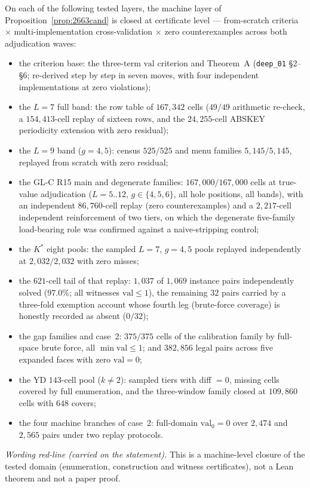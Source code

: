 \begin{theorem}\label{thm:machM}
On each of the following tested layers, the machine layer of
Proposition~\ref{prop:2663cand} is closed at certificate level ---
from-scratch criteria $\times$ multi-implementation cross-validation $\times$ zero
counterexamples across both adjudication waves:
\begin{itemize}[leftmargin=2em,itemsep=0.1em]
\item the criterion base: the three-term $\mathrm{val}$ criterion and
Theorem~A (\texttt{deep\_01} \S2--\S6; re-derived step by step in seven
moves, with four independent implementations at zero violations);
\item the $L=7$ full band: the row table of $167{,}342$ cells ($49/49$
arithmetic re-check, a $154{,}413$-cell replay of sixteen rows, and the
$24{,}255$-cell ABSKEY periodicity extension with zero residual);
\item the $L=9$ band ($g=4,5$): census $525/525$ and menu families
$5{,}145/5{,}145$, replayed from scratch with zero residual;
\item the GL-C R15 main and degenerate families: $167{,}000/167{,}000$
cells at true-value adjudication ($L=5..12$, $g\in\{4,5,6\}$, all hole
positions, all bands), with an independent $86{,}760$-cell replay (zero
counterexamples) and a $2{,}217$-cell independent reinforcement of two
tiers, on which the degenerate five-family load-bearing role was confirmed
against a naive-stripping control;
\item the $K^*$ eight pools: the sampled $L=7$, $g=4,5$ pools replayed
independently at $2{,}032/2{,}032$ with zero misses;
\item the $621$-cell tail of that replay: $1{,}037$ of $1{,}069$ instance
pairs independently solved ($97.0\%$; all witnesses $\mathrm{val}\le1$),
the remaining $32$ pairs carried by a three-fold exemption account whose
fourth leg (brute-force coverage) is honestly recorded as absent ($0/32$);
\item the gap families and case~2: $375/375$ cells of the calibration
family by full-space brute force, all $\min\mathrm{val}\le1$; and
$382{,}856$ legal pairs across five expanded faces with zero
$\mathrm{val}=0$;
\item the YD $143$-cell pool ($k\ne2$): sampled tiers with
diff $=0$, missing cells covered by full enumeration, and the
three-window family closed at $109{,}860$ cells with $648$ covers;
\item the four machine branches of case~2: full-domain $\mathrm{val}_0=0$
over $2{,}474$ and $2{,}565$ pairs under two replay protocols.
\end{itemize}
\emph{Wording red-line (carried on the statement).} This is a machine-level
closure of the tested domain (enumeration, construction and witness
certificates), not a Lean theorem and not a paper proof.
\end{theorem}


